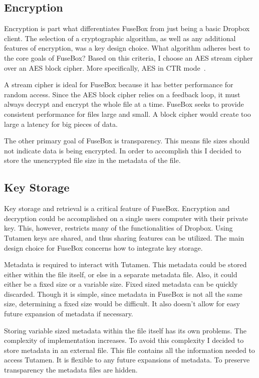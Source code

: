 \documentclass[11pt,twocolumn,letterpaper]{article}
\newcommand{\appname}{FuseBox }
\newcommand{\appnameWOspace}{FuseBox}
\newcommand{\custos}{Tutamen }
\newcommand{\custosWOspace}{Tutamen}
\begin{document}
\subsection{Encryption}
\label{sec:enc}
Encryption is part what differentiates \appname from just being a basic
Dropbox client. The selection of a cryptographic algorithm, as well as
any additional features of encryption, was a key design choice. What
algorithm adheres best to the core goals of \appnameWOspace? Based on
this criteria, I choose an AES stream cipher over an AES block
cipher. More specifically, AES in CTR mode~\cite{AESCTR}.  
\par A stream cipher is ideal for \appname because it has better
performance for random access. Since the AES block 
cipher relies on a feedback loop, it must always decrypt and encrypt
the whole file at a time. \appname seeks to provide consistent
performance for files large and small. A block cipher would create
too large a latency for big pieces of data.   
\par The other primary goal of \appname is transparency. This means
file sizes should not indicate data is being encrypted. In order to
accomplish this I decided to store the unencrypted file size in the
metadata of the file. 

\subsection{Key Storage}
\label{sec:keystorage}
Key storage and retrieval is a critical feature of \appnameWOspace. 
Encryption and decryption could be accomplished on a single users
computer with their private key. This, however, restricts many of the
functionalities of Dropbox. Using \custos keys are shared, and thus 
sharing features can be utilized. The main design choice for \appname
concerns how to integrate key storage.  
\par Metadata is required to interact with \custosWOspace. This
metadata could be stored either within the file itself, or else in a
separate metadata file. Also, it could either be a fixed size or a
variable size. Fixed sized metadata can be quickly discarded. Though
it is simple, since metadata in \appname is not all the same size,
determining a fixed size would be difficult. It also doesn't allow for
easy future expansion of metadata if necessary. 
\par Storing variable sized metadata within the file itself has its
own problems. The complexity of implementation increases. To avoid
this complexity I decided to store metadata in an external file. This
file contains all the information needed to access \custosWOspace. It
is flexible to any future expansions of metadata. 
To preserve transparency the metadata files are hidden. 
\end{document}
